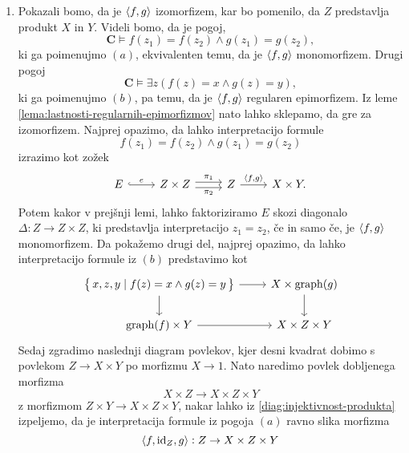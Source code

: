 \documentclass[../kategoricna_logika.tex]{subfiles}
\begin{document}
\begin{dokaz}
\begin{enumerate}[label=(\roman*)]
    \item Pokazali bomo, da je $\langle f,g \rangle$ izomorfizem, kar bo
      pomenilo, da $Z$ predstavlja produkt $X$ in $Y$. Videli bomo, da
      je pogoj,
      \[ \mathbf{C} \models f(z_{1}) = f(z_{2}) \land g(z_{1}) =
        g(z_{2}), \] ki ga poimenujmo \((a)\), ekvivalenten temu, da
      je \( \langle f,g \rangle\) monomorfizem.  Drugi pogoj
      \[ \mathbf{C} \models \exists z(f(z) = x \land g(z) = y), \] ki
      ga poimenujmo \((b)\), pa temu, da je \( \langle f,g \rangle\) regularen
      epimorfizem.  Iz leme
      \ref{lema:lastnosti-regularnih-epimorfizmov} nato lahko
      sklepamo, da gre za izomorfizem.  Najprej opazimo, da lahko
      interpretacijo formule
      \[ f(z_{1}) = f(z_{2}) \land g(z_{1}) = g(z_{2})\] izrazimo kot
      zožek
      \begin{equation*}
        \begin{tikzcd}
          E \ar[r, hook, "e"] & Z \times Z \ar[r, shift left,
          "\pi_{1}"] \ar[r, shift right, "\pi_{2}"'] & Z \ar[r, ,
          "\fprod{f, g}"] & X \times Y.
        \end{tikzcd}
      \end{equation*}
      Potem kakor v prejšnji lemi, lahko faktoriziramo $E$ skozi
      diagonalo $\Delta : Z \to Z \times Z$, ki predstavlja
      interpretacijo $z_{1} = z_{2}$, če in samo če, je $\langle f, g \rangle$
      monomorfizem.  Da pokažemo drugi del, najprej opazimo, da lahko
      interpretacijo formule iz $(b)$ predstavimo kot
      \begin{equation}\label{diag:injektivnost-produkta}
        \begin{tikzcd}
          \set{x,z,y \mid f(z) = x \land g(z) = y} \ar[d] \ar[r] &
          X \times \mathrm{graph}(g) \ar[d] \\
          \mathrm{graph}(f) \times Y \ar[r] & X \times Z \times Y
        \end{tikzcd}
      \end{equation}
      Sedaj zgradimo naslednji diagram povlekov, kjer desni kvadrat
      dobimo s povlekom $Z \to X \times Y$ po morfizmu $X \to 1$. Nato
      naredimo povlek dobljenega morfizma
      \[X \times Z \to X \times Z \times Y\] z morfizmom
      $Z \times Y \to X \times Z \times Y$, nakar lahko iz
      \eqref{diag:injektivnost-produkta} izpeljemo, da je
      interpretacija formule iz pogoja $(a)$ ravno slika morfizma
      \[\langle f, \mathrm{id}_{Z}, g \rangle : Z \to X \times Z \times Y\]
      \begin{equation*}
        \begin{tikzcd}[column sep=tiny]

\end{tikzcd}
\end{equation*}
\end{enumerate}
\end{dokaz}
\end{document}
